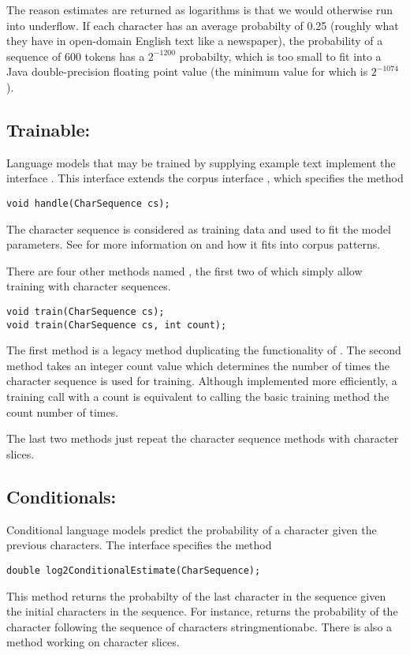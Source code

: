 The reason estimates are returned as logarithms is that we would
otherwise run into underflow.  If each character has an average
probabilty of 0.25 (roughly what they have in open-domain English text
like a newspaper), the probability of a sequence of 600 tokens has a
$2^{-1200}$ probabilty, which is too small to fit into a Java
double-precision floating point value (the minimum value for which is
$2^{-1074}$).

\subsection{Trainable: }

Language models that may be trained by supplying example text
implement the interface .  This interface
extends the corpus interface ,
which specifies the method
%
\begin{verbatim}
void handle(CharSequence cs);
\end{verbatim}
%
The character sequence is considered as training data and used to fit
the model parameters.  See  for more
information on  and how it fits into corpus
patterns.

There are four other methods named , the first two
of which simply allow training with character sequences.
%
\begin{verbatim}
void train(CharSequence cs);
void train(CharSequence cs, int count);
\end{verbatim}
%
The first method is a legacy method duplicating the functionality of
.  The second method takes an integer count value which
determines the number of times the character sequence is used for
training.  Although implemented more efficiently, a training call
with a count is equivalent to calling the basic training method the
count number of times.

The last two methods just repeat the character sequence methods
with character slices.


\subsection{Conditionals: }

Conditional language models predict the probability of a character
given the previous characters.  The interface
 specifies the method
%
\begin{verbatim}
double log2ConditionalEstimate(CharSequence);
\end{verbatim}
%
This method returns the probabilty of the last character in
the sequence given the initial characters in the sequence.  For
instance,  returns the
probability of the character  following the
sequence of characters stringmention{abc}.  There is also
a method working on character slices.

